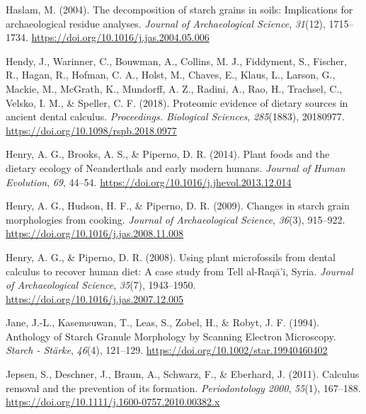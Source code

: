 \documentclass[
  b5paper,
]{book}
\newlength{\cslhangindent}
\newlength{\cslentryspacingunit} %
\newenvironment{CSLReferences}[2] %
 {%
  \setlength{\parindent}{0pt}
  \ifodd #1
  \let\oldpar\par
  \def\par{\hangindent=\cslhangindent\oldpar}
  \fi
  \setlength{\parskip}{#2\cslentryspacingunit}
 }%
 {}
\begin{document}
\begin{CSLReferences}{1}{0}
\leavevmode{}%
Haslam, M. (2004). The decomposition of starch grains in soils:
Implications for archaeological residue analyses. \emph{Journal of
Archaeological Science}, \emph{31}(12), 1715--1734.
\url{https://doi.org/10.1016/j.jas.2004.05.006}

\leavevmode{}%
Hendy, J., Warinner, C., Bouwman, A., Collins, M. J., Fiddyment, S.,
Fischer, R., Hagan, R., Hofman, C. A., Holst, M., Chaves, E., Klaus, L.,
Larson, G., Mackie, M., McGrath, K., Mundorff, A. Z., Radini, A., Rao,
H., Trachsel, C., Velsko, I. M., \& Speller, C. F. (2018). Proteomic
evidence of dietary sources in ancient dental calculus.
\emph{Proceedings. Biological Sciences}, \emph{285}(1883), 20180977.
\url{https://doi.org/10.1098/rspb.2018.0977}

\leavevmode{}%
Henry, A. G., Brooks, A. S., \& Piperno, D. R. (2014). Plant foods and
the dietary ecology of {Neanderthals} and early modern humans.
\emph{Journal of Human Evolution}, \emph{69}, 44--54.
\url{https://doi.org/10.1016/j.jhevol.2013.12.014}

\leavevmode{}%
Henry, A. G., Hudson, H. F., \& Piperno, D. R. (2009). Changes in starch
grain morphologies from cooking. \emph{Journal of Archaeological
Science}, \emph{36}(3), 915--922.
\url{https://doi.org/10.1016/j.jas.2008.11.008}

\leavevmode{}%
Henry, A. G., \& Piperno, D. R. (2008). Using plant microfossils from
dental calculus to recover human diet: A case study from {Tell}
al-{Raq{ā}}'i, {Syria}. \emph{Journal of Archaeological Science},
\emph{35}(7), 1943--1950.
\url{https://doi.org/10.1016/j.jas.2007.12.005}

\leavevmode{}%
Jane, J.-L., Kasemsuwan, T., Leas, S., Zobel, H., \& Robyt, J. F.
(1994). Anthology of {Starch Granule Morphology} by {Scanning Electron
Microscopy}. \emph{Starch - St{ä}rke}, \emph{46}(4), 121--129.
\url{https://doi.org/10.1002/star.19940460402}

\leavevmode{}%
Jepsen, S., Deschner, J., Braun, A., Schwarz, F., \& Eberhard, J.
(2011). Calculus removal and the prevention of its formation.
\emph{Periodontology 2000}, \emph{55}(1), 167--188.
\url{https://doi.org/10.1111/j.1600-0757.2010.00382.x}


\end{CSLReferences}
\end{document}
